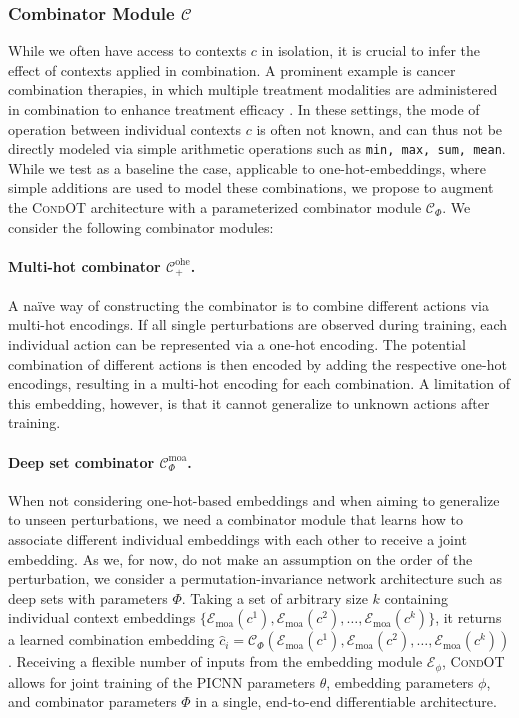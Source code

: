 \subsubsection{Combinator Module $\mathcal{C}$}
 While we often have access to contexts $c$ in isolation, it is crucial to infer the effect of contexts applied in combination. A prominent example is cancer combination therapies, in which multiple treatment modalities are administered in combination to enhance treatment efficacy \citep{kummar2010utilizing}.
In these settings, the mode of operation between individual contexts $c$ is often not known, and can thus not be directly modeled via simple arithmetic operations such as 
\texttt{min, max, sum, mean}.
While we test as a baseline the case, applicable to one-hot-embeddings, where simple additions are used to model these combinations, we propose to augment the \textsc{CondOT} architecture with a parameterized combinator module $\mathcal{C}_\Phi$. We consider the following combinator modules:

\paragraph{Multi-hot combinator $\mathcal{C}^\text{ohe}_+$.}
A na\"ive way of constructing the combinator is to combine different actions via multi-hot encodings. If all single perturbations are observed during training, each individual action can be represented via a one-hot encoding. The potential combination of different actions is then encoded by adding the respective one-hot encodings, resulting in a multi-hot encoding for each combination.
A limitation of this embedding, however, is that it cannot generalize to unknown actions after training.

\paragraph{Deep set combinator $\mathcal{C}^\text{moa}_\Phi$.}
When not considering one-hot-based embeddings and when aiming to generalize to unseen perturbations, we need a combinator module that learns how to associate different individual embeddings with each other to receive a joint embedding.
As we, for now, do not make an assumption on the order of the perturbation, we consider a permutation-invariance network architecture such as deep sets \citep{zaheer2017deep} with parameters $\Phi$. Taking a set of arbitrary size $k$ containing individual context embeddings $\{\mathcal{E}_\text{moa}(c^1), \mathcal{E}_\text{moa}(c^2), \dots, \mathcal{E}_\text{moa}(c^k)\}$, it returns a learned combination embedding $\hat{c}_i = \mathcal{C}_\Phi(\mathcal{E}_\text{moa}(c^1), \mathcal{E}_\text{moa}(c^2), \dots, \mathcal{E}_\text{moa}(c^k))$.
Receiving a flexible number of inputs from the embedding module $\mathcal{E}_\phi$, \textsc{CondOT} allows for joint training of the PICNN parameters $\theta$, embedding parameters $\phi$, and combinator parameters $\Phi$ in a single, end-to-end differentiable architecture.


